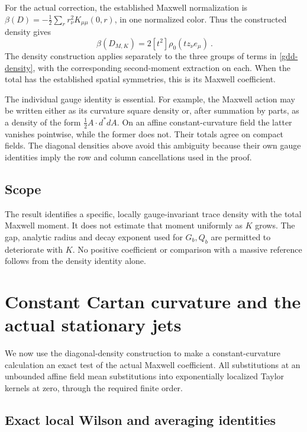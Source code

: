 \documentclass[11pt]{article}
\theoremstyle{remark}
\begin{document}
For the actual correction, the established Maxwell
normalization is
\(\beta(D)=-\tfrac12\sum_r r_\nu^2K_{\mu\mu}(0,r)\),
in one normalized color. Thus the constructed density gives
\begin{equation}
                  \boxed{\ \beta(D_{M,K})
                            =2[t^2]\rho_0(tz_\nu e_\mu)\ }.
 \label{gdd-beta-density}
\end{equation}
The density construction applies separately to the
three groups of terms in \eqref{gdd-density}, with the
corresponding second-moment extraction on each.
When the total has the established spatial symmetries,
this is its Maxwell coefficient.

The individual gauge identity is essential. For example,
the Maxwell action may be written either as its curvature
square density or, after summation by parts, as a density
of the form \(\tfrac12 A\cdot d^*dA\). On an affine
constant-curvature field the latter vanishes pointwise,
while the former does not. Their totals agree on compact
fields. The diagonal densities above avoid this ambiguity
because their own gauge identities imply the row and
column cancellations used in the proof.

\subsection{Scope}
\label{gdd-scope}

The result identifies a specific, locally gauge-invariant
trace density with the total Maxwell moment. It does not
estimate that moment uniformly as \(K\) grows. The gap,
analytic radius and decay exponent used for \(G_b,Q_b\)
are permitted to deteriorate with \(K\). No positive
coefficient or comparison with a massive reference
follows from the density identity alone.


\section{Constant Cartan curvature and the actual stationary jets}
\label{cdmom-section}

We now use the diagonal-density construction to make a
constant-curvature calculation an exact test of the actual
Maxwell coefficient. All substitutions at an unbounded
affine field mean substitutions into exponentially localized
Taylor kernels at zero, through the required finite order.

\subsection{Exact local Wilson and averaging identities}
\label{cdmom-affine-section}
\end{document}
